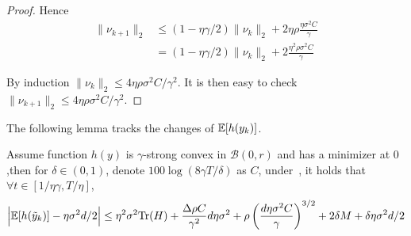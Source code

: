 \begin{proof}
Hence 
\begin{align*}
    \| \nu_{k + 1} \|_2 &\le (1 - \eta \gamma/2)  \| \nu_k \|_2 + 2 \eta \rho \frac{\eta \sigma^2 C}{\gamma}  \\
    &= (1 - \eta \gamma/2)  \| \nu_k \|_2  + 2  \frac{\eta^2 \rho \sigma^2 C}{\gamma}
\end{align*}

By induction $\| \nu_k \|_2 \le 4{\eta \rho \sigma^2 C}/{\gamma^2}$. It is then easy to check $\| \nu_{k + 1} \|_2 \le  4{\eta \rho \sigma^2 C}/{\gamma^2}$.
\end{proof}

The following lemma tracks the changes of $\mathbb{E}[h(y_k)]$.
\begin{lemma}
\label{lem:tracksgd}
    Assume function $h(y)$ is $\gamma$-strong convex in $\mathcal{B}(0,r)$ and has a minimizer at $0$,then for $\delta \in (0,1)$, denote $100 \log(8\gamma T / \delta) $ as $C$, under~, it holds that $\forall t \in [1/\eta \gamma, T /\eta]$,
    \begin{align*}
    \Big | \mathbb{E}[h(\tilde y_k)] -  \eta \sigma^2d / 2\Big|\le \eta^2 \sigma^2 \mathrm{Tr}(H) + \frac{ \Delta \rho C}{\gamma^2} d \eta  \sigma^2 + \rho \left( \frac{ d \eta \sigma^2  C}{{\gamma}} \right)^{3/2} + 2\delta M + \delta \eta \sigma^2 d / 2
    \end{align*}
\end{lemma}

